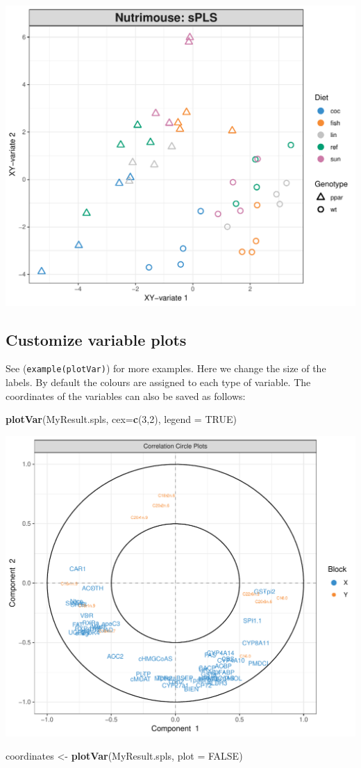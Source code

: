 \documentclass[]{book}
\newenvironment{Shaded}{\begin{snugshade}}{\end{snugshade}}
\newcommand{\DataTypeTok}[1]{\textcolor[rgb]{0.13,0.29,0.53}{#1}}
\newcommand{\DecValTok}[1]{\textcolor[rgb]{0.00,0.00,0.81}{#1}}
\newcommand{\KeywordTok}[1]{\textcolor[rgb]{0.13,0.29,0.53}{\textbf{#1}}}
\newcommand{\NormalTok}[1]{#1}
\newcommand{\OtherTok}[1]{\textcolor[rgb]{0.56,0.35,0.01}{#1}}
\newcommand{\StringTok}[1]{\textcolor[rgb]{0.31,0.60,0.02}{#1}}
\begin{document}
\begin{center}\includegraphics[width=0.5\linewidth,]{Figures/05-pls-plotIndiv-2-1} \end{center}

\hypertarget{pls:plotVar}{%
\subsection{Customize variable plots}\label{pls:plotVar}}

See (\texttt{example(plotVar)}) for more examples. Here we change the size of the labels. By default the colours are assigned to each type of variable. The coordinates of the variables can also be saved as follows:

\begin{Shaded}
\begin{Highlighting}[]
\KeywordTok{plotVar}\NormalTok{(MyResult.spls, }\DataTypeTok{cex=}\KeywordTok{c}\NormalTok{(}\DecValTok{3}\NormalTok{,}\DecValTok{2}\NormalTok{), }\DataTypeTok{legend =} \OtherTok{TRUE}\NormalTok{)}
\end{Highlighting}
\end{Shaded}

\begin{center}\includegraphics[width=0.5\linewidth,]{Figures/05-pls-plotVar-1-1} \end{center}

\begin{Shaded}
\begin{Highlighting}[]
\NormalTok{coordinates <-}\StringTok{ }\KeywordTok{plotVar}\NormalTok{(MyResult.spls, }\DataTypeTok{plot =} \OtherTok{FALSE}\NormalTok{)}
\end{Highlighting}
\end{Shaded}
\end{document}
